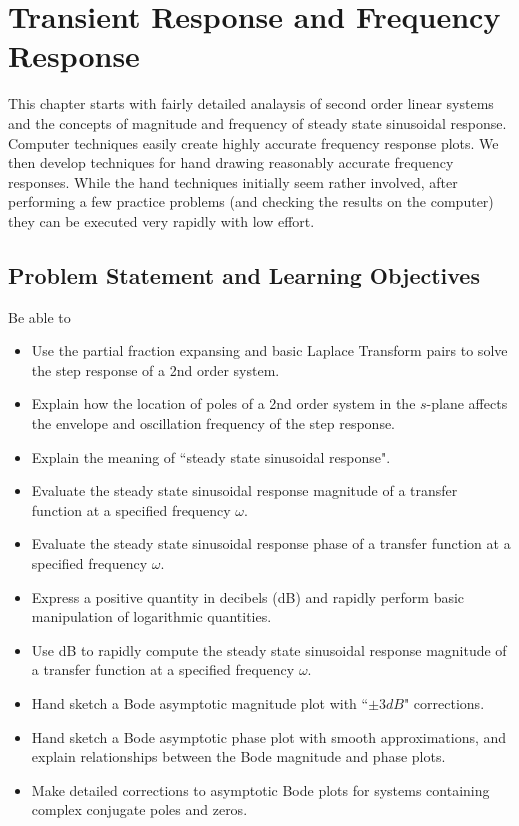 %
%
%

\chapter{Transient Response and Frequency Response}\label{2ndOrderTransientChapter}

This chapter starts with fairly detailed analaysis of second order linear systems and the concepts of magnitude and frequency of steady state sinusoidal response.  Computer techniques easily create highly accurate frequency response plots.   We then develop   techniques for hand drawing reasonably accurate frequency responses.   While the hand techniques initially seem rather involved, after performing a few practice problems (and checking the results on the computer) they can be executed very rapidly with low effort.

\section{Problem Statement and Learning Objectives}
Be able to
\begin{itemize}
    \item Use the partial fraction expansing and basic Laplace Transform pairs to
    solve the step response of a 2nd order system.
    \item Explain how the location of poles of a 2nd order system in the $s$-plane
    affects the envelope and oscillation frequency of the step response.
    \item Explain the meaning of ``steady state sinusoidal response".
    \item Evaluate the steady state sinusoidal response magnitude of a transfer function
    at a specified frequency $\omega$.
    \item Evaluate the steady state sinusoidal response phase of a transfer function
    at a specified frequency $\omega$.
    \item Express a positive quantity in decibels (dB) and rapidly perform basic manipulation of
    logarithmic quantities.
    \item Use dB to rapidly compute  the steady state sinusoidal response magnitude of a transfer function
    at a specified frequency $\omega$.

    \item Hand sketch a Bode asymptotic magnitude plot with ``$\pm3dB$" corrections.
    \item Hand sketch a Bode asymptotic phase plot with smooth approximations,
    and explain relationships between the Bode magnitude and phase plots.
    \item Make detailed corrections to asymptotic Bode plots for systems containing complex conjugate poles and zeros.

\end{itemize}


